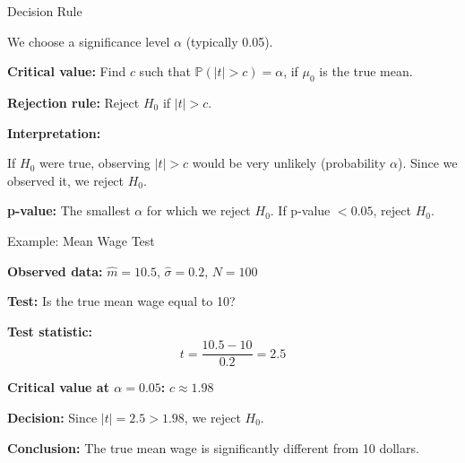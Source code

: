 \documentclass{beamer}
\begin{document}
\begin{frame}{Decision Rule}

We choose a significance level $\alpha$ (typically 0.05).

\vspace{0.3cm}

\textbf{Critical value:} Find $c$ such that $\mathbb{P}(|t| > c) = \alpha$, if $\mu_0$ is the true mean.

\vspace{0.3cm}

\textbf{Rejection rule:} Reject $H_0$ if $|t| > c$.

\vspace{0.5cm}

\textbf{Interpretation:}

If $H_0$ were true, observing $|t| > c$ would be very unlikely (probability $\alpha$).  
Since we observed it, we reject $H_0$.

\vspace{0.3cm}

\textbf{p-value:} The smallest $\alpha$ for which we reject $H_0$.  
If p-value $< 0.05$, reject $H_0$.

\end{frame}

\begin{frame}{Example: Mean Wage Test}

\textbf{Observed data:} $\hat{m} = 10.5$, $\hat{\sigma} = 0.2$, $N = 100$

\medskip

\textbf{Test:} Is the true mean wage equal to 10?

\medskip

\textbf{Test statistic:}
\[ t = \frac{10.5 - 10}{0.2} = 2.5 \]

\medskip

\textbf{Critical value at $\alpha = 0.05$:} $c \approx 1.98$

\medskip

\textbf{Decision:} Since $|t| = 2.5 > 1.98$, we reject $H_0$.

\medskip

\textbf{Conclusion:} The true mean wage is significantly different from 10 dollars.

\end{frame}
\end{document}
